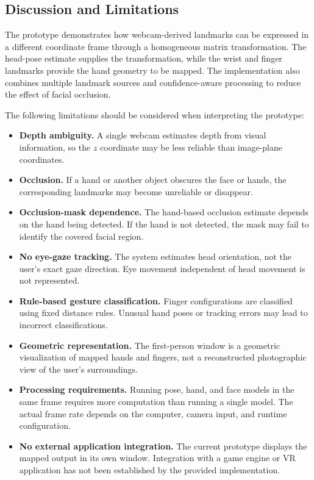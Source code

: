 \documentclass[12pt,a4paper]{article}
\begin{document}
\subsection{Discussion and Limitations}

The prototype demonstrates how webcam-derived landmarks can be expressed in a different coordinate frame through a homogeneous matrix transformation. The head-pose estimate supplies the transformation, while the wrist and finger landmarks provide the hand geometry to be mapped. The implementation also combines multiple landmark sources and confidence-aware processing to reduce the effect of facial occlusion.

The following limitations should be considered when interpreting the prototype:

\begin{itemize}
    \item \textbf{Depth ambiguity.} A single webcam estimates depth from visual information, so the $z$ coordinate may be less reliable than image-plane coordinates.
    \item \textbf{Occlusion.} If a hand or another object obscures the face or hands, the corresponding landmarks may become unreliable or disappear.
    \item \textbf{Occlusion-mask dependence.} The hand-based occlusion estimate depends on the hand being detected. If the hand is not detected, the mask may fail to identify the covered facial region.
    \item \textbf{No eye-gaze tracking.} The system estimates head orientation, not the user's exact gaze direction. Eye movement independent of head movement is not represented.
    \item \textbf{Rule-based gesture classification.} Finger configurations are classified using fixed distance rules. Unusual hand poses or tracking errors may lead to incorrect classifications.
    \item \textbf{Geometric representation.} The first-person window is a geometric visualization of mapped hands and fingers, not a reconstructed photographic view of the user's \mbox{surroundings}.
    \item \textbf{Processing requirements.} Running pose, hand, and face models in the same frame requires more computation than running a single model. The actual frame rate depends on the computer, camera input, and runtime configuration.
    \item \textbf{No external application integration.} The current prototype displays the mapped output in its own window. Integration with a game engine or VR application has not been established by the provided implementation.
\end{itemize}
\end{document}

